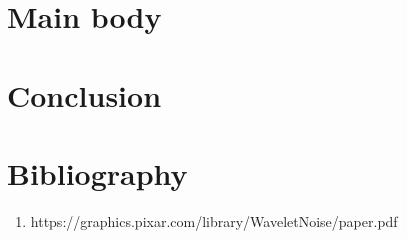 \documentclass[11pt,a4paper]{article}
\begin{document}
\section{Main body}



\section{Conclusion}



\section{Bibliography}

\begin{enumerate}
\item https://graphics.pixar.com/library/WaveletNoise/paper.pdf
\end{enumerate}
\end{document}
